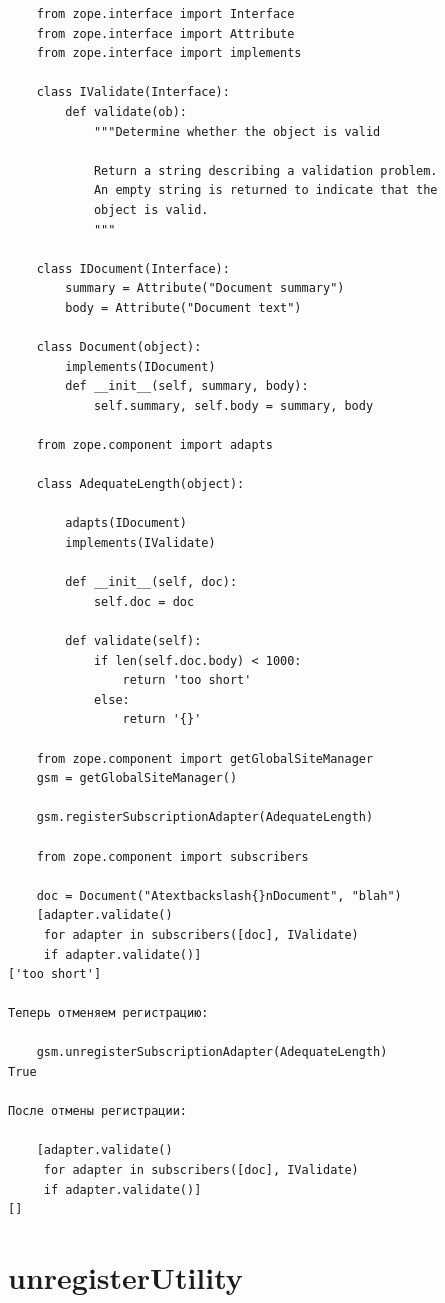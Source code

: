 \documentclass[a4paper,openany,twoside,draft]{book}
\begin{document}
\begin{verbatim}
    from zope.interface import Interface
    from zope.interface import Attribute
    from zope.interface import implements

    class IValidate(Interface):
        def validate(ob):
            """Determine whether the object is valid

            Return a string describing a validation problem.
            An empty string is returned to indicate that the
            object is valid.
            """

    class IDocument(Interface):
        summary = Attribute("Document summary")
        body = Attribute("Document text")

    class Document(object):
        implements(IDocument)
        def __init__(self, summary, body):
            self.summary, self.body = summary, body

    from zope.component import adapts

    class AdequateLength(object):

        adapts(IDocument)
        implements(IValidate)

        def __init__(self, doc):
            self.doc = doc

        def validate(self):
            if len(self.doc.body) < 1000:
                return 'too short'
            else:
                return '{}'

    from zope.component import getGlobalSiteManager
    gsm = getGlobalSiteManager()

    gsm.registerSubscriptionAdapter(AdequateLength)

    from zope.component import subscribers

    doc = Document("Atextbackslash{}nDocument", "blah")
    [adapter.validate()
     for adapter in subscribers([doc], IValidate)
     if adapter.validate()]
['too short']

Теперь отменяем регистрацию:

    gsm.unregisterSubscriptionAdapter(AdequateLength)
True

После отмены регистрации:

    [adapter.validate()
     for adapter in subscribers([doc], IValidate)
     if adapter.validate()]
[]
\end{verbatim}


\section*{unregisterUtility%
  \label{unregisterutility}%
}
\end{document}
